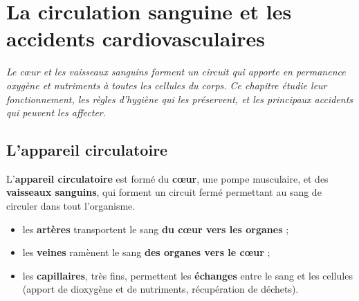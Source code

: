\chapter{La circulation sanguine et les accidents cardiovasculaires}

\noindent\textit{Le cœur et les vaisseaux sanguins forment un circuit qui apporte en
permanence oxygène et nutriments à toutes les cellules du corps. Ce chapitre étudie
leur fonctionnement, les règles d'hygiène qui les préservent, et les principaux
accidents qui peuvent les affecter.}
\vspace{8pt}

\connecteBanner

\section{L'appareil circulatoire}

\begin{definition}
L'\textbf{appareil circulatoire} est formé du \textbf{cœur}, une pompe musculaire, et
des \textbf{vaisseaux sanguins}, qui forment un circuit fermé permettant au sang de
circuler dans tout l'organisme.
\end{definition}

\begin{propriete}
\begin{itemize}
\item les \textbf{artères} transportent le sang \textbf{du cœur vers les organes} ;
\item les \textbf{veines} ramènent le sang \textbf{des organes vers le cœur} ;
\item les \textbf{capillaires}, très fins, permettent les \textbf{échanges} entre le
sang et les cellules (apport de dioxygène et de nutriments, récupération de
déchets).
\end{itemize}
\end{propriete}

\begin{illus}
\end{illus}

